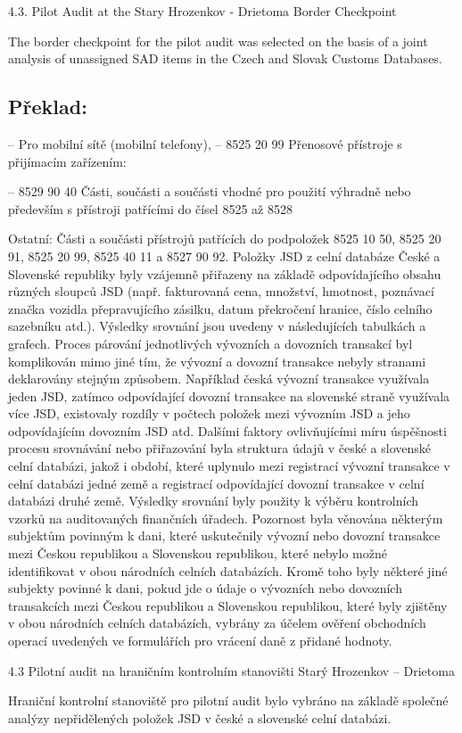 \documentclass[10pt]{article}
\begin{document}
4.3. Pilot Audit at the Stary Hrozenkov - Drietoma Border Checkpoint

The border checkpoint for the pilot audit was selected on the basis of a joint analysis of unassigned SAD items in the Czech and Slovak Customs Databases.


\pagebreak

\subsection*{Překlad:}



– Pro mobilní sítě (mobilní telefony), – 8525 20 99 Přenosové přístroje s přijímacím zařízením:



– 8529 90 40 Části, součásti a součásti vhodné pro použití výhradně nebo především s přístroji patřícími do čísel 8525 až 8528

Ostatní: Části a součásti přístrojů patřících do podpoložek 8525 10 50, 8525 20 91, 8525 20 99, 8525 40 11 a 8527 90 92.
Položky JSD z celní databáze České a Slovenské republiky byly vzájemně přiřazeny na základě odpovídajícího obsahu různých sloupců JSD (např. fakturovaná cena, množství, hmotnost, poznávací značka vozidla přepravujícího zásilku, datum překročení hranice, číslo celního sazebníku atd.).
Výsledky srovnání jsou uvedeny v následujících tabulkách a grafech.
Proces párování jednotlivých vývozních a dovozních transakcí byl komplikován mimo jiné tím, že vývozní a dovozní transakce nebyly stranami deklarovány stejným způsobem.
Například česká vývozní transakce využívala jeden JSD, zatímco odpovídající dovozní transakce na slovenské straně využívala více JSD, existovaly rozdíly v počtech položek mezi vývozním JSD a jeho odpovídajícím dovozním JSD atd.
Dalšími faktory ovlivňujícími míru úspěšnosti procesu srovnávání nebo přiřazování byla struktura údajů v české a slovenské celní databázi, jakož i období, které uplynulo mezi registrací vývozní transakce v celní databázi jedné země a registrací odpovídající dovozní transakce v celní databázi druhé země.
Výsledky srovnání byly použity k výběru kontrolních vzorků na auditovaných finančních úřadech.
Pozornost byla věnována některým subjektům povinným k dani, které uskutečnily vývozní nebo dovozní transakce mezi Českou republikou a Slovenskou republikou, které nebylo možné identifikovat v obou národních celních databázích.
Kromě toho byly některé jiné subjekty povinné k dani, pokud jde o údaje o vývozních nebo dovozních transakcích mezi Českou republikou a Slovenskou republikou, které byly zjištěny v obou národních celních databázích, vybrány za účelem ověření obchodních operací uvedených ve formulářích pro vrácení daně z přidané hodnoty.


4.3 Pilotní audit na hraničním kontrolním stanovišti Starý Hrozenkov – Drietoma

Hraniční kontrolní stanoviště pro pilotní audit bylo vybráno na základě společné analýzy nepřidělených položek JSD v české a slovenské celní databázi.
\end{document}
